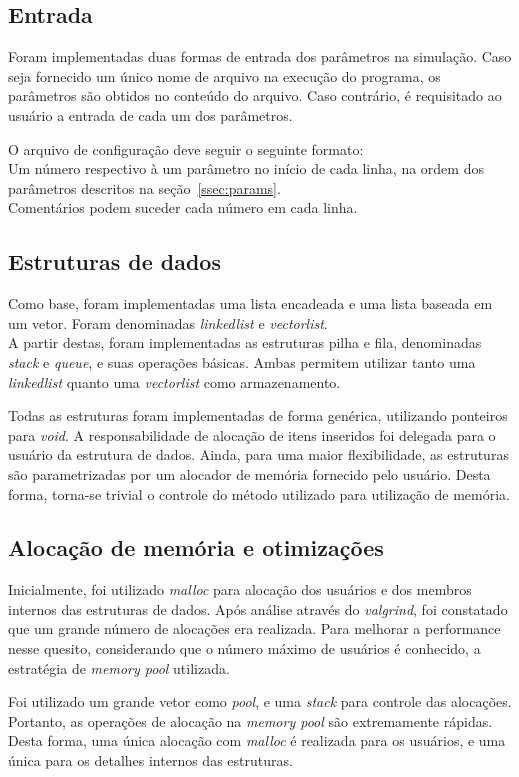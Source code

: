 \documentclass{article}
\begin{document}
\subsection{Entrada}
Foram implementadas duas formas de entrada dos parâmetros na simulação. Caso seja fornecido um único nome de arquivo na execução do programa, os parâmetros são obtidos no conteúdo do arquivo. Caso contrário, é requisitado ao usuário a entrada de cada um dos parâmetros.

O arquivo de configuração deve seguir o seguinte formato:\\
Um número respectivo à um parâmetro no início de cada linha, na ordem dos parâmetros descritos na seção~\ref{ssec:params}.\\
Comentários podem suceder cada número em cada linha.

\subsection{Estruturas de dados}
Como base, foram implementadas uma lista encadeada e uma lista baseada em um vetor. Foram denominadas \textit{linkedlist} e \textit{vectorlist}.\\
A partir destas, foram implementadas as estruturas pilha e fila, denominadas \textit{stack} e \textit{queue}, e suas operações básicas. Ambas permitem utilizar tanto uma \textit{linkedlist} quanto uma \textit{vectorlist} como armazenamento.

Todas as estruturas foram implementadas de forma genérica, utilizando ponteiros para \textit{void}. A responsabilidade de alocação de itens inseridos foi delegada para o usuário da estrutura de dados.
Ainda, para uma maior flexibilidade, as estruturas são parametrizadas por um alocador de memória fornecido pelo usuário. Desta forma, torna-se trivial o controle do método utilizado para utilização de memória.

\subsection{Alocação de memória e otimizações}
Inicialmente, foi utilizado \textit{malloc} para alocação dos usuários e dos membros internos das estruturas de dados. Após análise através do \textit{valgrind}, foi constatado que um grande número de alocações era realizada. Para melhorar a performance nesse quesito, considerando que o número máximo de usuários é conhecido, a estratégia de \textit{memory pool} utilizada.

Foi utilizado um grande vetor como \textit{pool}, e uma \textit{stack} para controle das alocações. Portanto, as operações de alocação na \textit{memory pool} são extremamente rápidas. Desta forma, uma única alocação com \textit{malloc} é realizada para os usuários, e uma única para os detalhes internos das estruturas.
\end{document}
